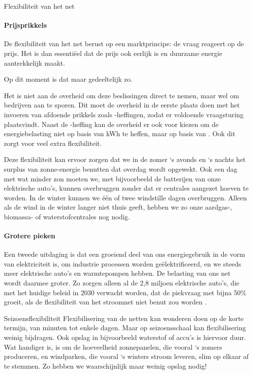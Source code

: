 \begin{voorstel}{Flexibiliteit van het net}
\begin{multicols*}{2}
\begin{overwegingen}
\paragraph{Prijsprikkels}
De flexibiliteit van het net berust op een marktprincipe: de vraag reageert op de prijs. Het is dan essentiëel dat de prijs ook eerlijk is en duurzame energie aantrekkelijk maakt.

Op dit moment is dat maar gedeeltelijk zo.

Het is niet aan de overheid om deze beslissingen direct te nemen, maar wel om bedrijven aan te sporen. Dit moet de overheid in de eerste plaats doen met het invoeren van afdoende prikkels zoals \COO-heffingen, zodat er voldoende vraagsturing plaatsvindt. Naast de \COO-heffing kan de overheid er ook voor kiezen om de energiebelasting niet op basis van kWh te heffen, maar op basis van \COO. Ook dit zorgt voor veel extra flexibiliteit.

Deze flexibiliteit kan ervoor zorgen dat we in de zomer ‘s avonds en ‘s nachts het surplus van zonne-energie benutten dat overdag wordt opgewekt. Ook een dag met wat minder zon moeten we, met bijvoorbeeld de batterijen van onze elektrische auto’s, kunnen overbruggen zonder dat er centrales aangezet hoeven te worden. In de winter kunnen we één of twee windstille dagen overbruggen. Alleen als de wind in de winter langer niet thuis geeft, hebben we zo onze aardgas-, biomassa- of waterstofcentrales nog nodig.

\paragraph{Grotere pieken} Een tweede uitdaging is dat een groeiend deel van ons energiegebruik in de vorm van elektriciteit is, om industrie processen worden geëlektrificeerd, en we steeds meer elektrische auto’s en warmtepompen hebben. De belasting van ons net wordt daarmee groter. Zo zorgen alleen al de 2,8 miljoen elektrische auto’s, die met het huidige beleid in 2030 verwacht worden, dat de piekvraag met bijna 50\% groeit, als de flexibiliteit van het stroomnet niet benut zou worden \parencite{enpuls_slim_2019}.


\begin{infobox}{Seizoensflexibiliteit}
Flexibilisering van de netten kan wonderen doen op de korte termijn, van minuten tot enkele dagen. Maar op seizoensschaal kan flexibilisering weinig bijdragen. Ook opslag in bijvoorbeeld waterstof of accu’s is hiervoor duur. Wat handiger is, is om de hoeveelheid zonnepanelen, die vooral ‘s zomers produceren, en windparken, die vooral ‘s winters stroom leveren, slim op elkaar af te stemmen. Zo hebben we waarschijnlijk maar weinig opslag nodig!
\end{infobox}


\end{overwegingen}
\end{multicols*}
\end{voorstel}
